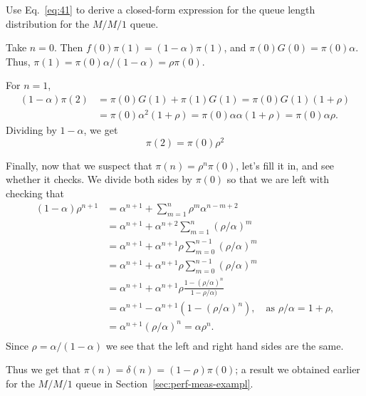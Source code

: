\begin{question}
  Use Eq.~\eqref{eq:41} to derive a closed-form expression for the
  queue length distribution for the $M/M/1$ queue.  

    \begin{solution}
      Take $n=0$. Then $f(0) \pi(1) = (1-\alpha)\pi(1)$, and
      $\pi(0)G(0) = \pi(0)\alpha$. Thus,
      $\pi(1) = \pi(0)\alpha/(1-\alpha) = \rho \pi(0)$. 

For $n=1$,
\begin{equation*}
  \begin{split}
  (1-\alpha)  \pi(2) 
&= \pi(0)G(1) + \pi(1)G(1) = \pi(0)G(1)(1+\rho) \\
&= \pi(0)\alpha^2(1+\rho) = \pi(0)\alpha \alpha (1+\rho) = \pi(0)\alpha \rho.
  \end{split}
\end{equation*}
Dividing by $1-\alpha$, we get
\begin{equation*}
  \pi(2) = \pi(0)\rho^2
\end{equation*}

Finally, now that we suspect that $\pi(n) = \rho^n \pi(0)$, let's fill
it in, and see whether it checks. We divide both sides by $\pi(0)$ so
that we are left with checking that
\begin{equation*}
  \begin{split}
    (1-\alpha)\rho^{n+1} 
&= \alpha^{n+1} + \sum_{m=1}^n \rho^m \alpha^{n-m+2}  \\
&= \alpha^{n+1} + \alpha^{n+2}\sum_{m=1}^n (\rho/\alpha)^m  \\
&= \alpha^{n+1} + \alpha^{n+1}\rho \sum_{m=0}^{n-1} (\rho/\alpha)^m \\
&= \alpha^{n+1} + \alpha^{n+1}\rho \sum_{m=0}^{n-1} (\rho/\alpha)^m\\
&= \alpha^{n+1} + \alpha^{n+1}\rho \frac{1-(\rho/\alpha)^n}{1-\rho/\alpha)}\\
&= \alpha^{n+1} - \alpha^{n+1}(1-(\rho/\alpha)^n), \quad\text{as } \rho/\alpha = 1+\rho,\\
&= \alpha^{n+1}(\rho/\alpha)^n = \alpha \rho^n.\\
  \end{split}
\end{equation*}
Since $\rho=\alpha/(1-\alpha)$ we see that the left and right hand sides are the same. 

Thus we get that $\pi(n) = \delta(n) = (1-\rho) \pi(0)$; a result we
obtained earlier for the $M/M/1$ queue in
Section~\ref{sec:perf-meas-exampl}.
\end{solution}
\end{question}


